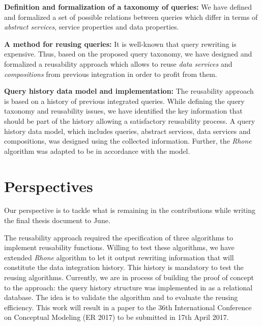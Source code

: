 \bigskip
\noindent \textbf{Definition and formalization of a taxonomy of queries:}
We have defined and formalized a set of possible relations between queries which differ in terms of \textsl{abstract services}, service properties and data properties.

\bigskip
\noindent \textbf{A method for reusing queries:}
It is well-known that query rewriting is expensive. Thus, based on the proposed query taxonomy, we have designed and formalized a reusability approach which allows to reuse \textsl{data services} and \textsl{compositions} from previous integration in order to profit from them.

\bigskip
\noindent \textbf{Query history data model and implementation:}
The reusability approach is based on a history of previous integrated queries. While defining the query taxonomy and reusability issues, we have identified the key information that should be part of the history allowing a satisfactory reusability process. A query history data model, which includes queries, abstract services, data services and compositions, was designed using the collected information. Further, the \textsl{Rhone} algorithm was adapted to be in accordance with the model.


\section{Perspectives}
Our perspective is to tackle what is remaining in the contributions while writing the final thesis document to June.

The reusability approach required the specification of three algorithms to implement reusability functions. 
Willing to test these algorithms, we have extended \textit{Rhone} algorithm to let it output rewriting information that will constitute the data integration history. This history is mandatory to test the reusing algorithms. 
Currently, we are in process of building the proof of concept to the approach: the query history structure was implemented in as a relational database. The idea is to validate the algorithm and to evaluate the reusing efficiency. This work will result in a paper to the 36th International Conference on Conceptual Modeling (ER 2017) to be submitted in 17th April 2017.